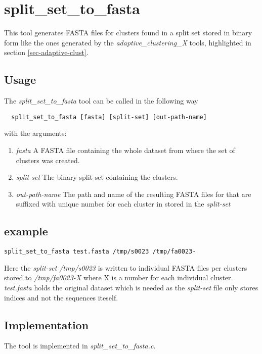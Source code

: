 \section{split\_set\_to\_fasta} \label{sec-sstofasta}

This tool generates FASTA files for clusters found in a split set stored in
binary form like the ones generated by the
\emph{adaptive\_clustering\_X} tools, highlighted in section
\ref{sec-adaptive-clust}.

\subsection{Usage}
The \emph{split\_set\_to\_fasta} tool can be called in the following way
\begin{lstlisting}
  split_set_to_fasta [fasta] [split-set] [out-path-name]
\end{lstlisting}
with the arguments:
\begin{enumerate}
  \item \emph{fasta} A FASTA file containing the whole dataset from
    where the set of clusters was created.
  \item \emph{split-set} The binary split set containing the
    clusters.
  \item \emph{out-path-name} The path and name of the resulting FASTA
    files for that are suffixed with unique number for each cluster in
    stored in the \emph{split-set}
\end{enumerate}

\subsection{example}
\begin{lstlisting}
split_set_to_fasta test.fasta /tmp/s0023 /tmp/fa0023-
\end{lstlisting}
Here the \emph{split-set} \emph{/tmp/s0023} is written to individual
FASTA files per clusters stored to
\emph{/tmp/fa0023-X} where X is a number for each individual cluster.
\emph{test.fasta} holds the original dataset
which is needed as the \emph{split-set} file only stores indices and
not the sequences iteself.

\subsection{Implementation}
The tool is implemented in \emph{split\_set\_to\_fasta.c}. 
